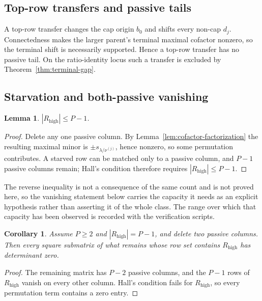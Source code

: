 \documentclass[11pt,a4paper]{amsart}
\numberwithin{equation}{section}
\theoremstyle{plain}
\newtheorem{lemma}[theorem]{Lemma}
\newtheorem{corollary}[theorem]{Corollary}
\theoremstyle{definition}
\begin{document}
\subsection{Top-row transfers and passive tails}

A top-row transfer changes the cap origin \(b_0\) and shifts every non-cap \(d_j\).  Connectedness makes the larger parent's terminal maximal cofactor nonzero, so the terminal shift is necessarily supported.  Hence a top-row transfer has no passive tail.  On the ratio-identity locus such a transfer is excluded by Theorem~\ref{thm:terminal-gap}.

\subsection{Starvation and both-passive vanishing}

\begin{lemma}\label{lem:starvation}
\(|R_{\mathrm{high}}|\le P-1\).
\end{lemma}

\begin{proof}
Delete any one passive column.  By Lemma~\ref{lem:cofactor-factorization} the resulting maximal minor is \(\pm s_{\lambda/\nu^{(j)}}\), hence nonzero, so some permutation contributes.  A starved row can be matched only to a passive column, and \(P-1\) passive columns remain; Hall's condition therefore requires \(|R_{\mathrm{high}}|\le P-1\).
\end{proof}

The reverse inequality is not a consequence of the same count and is not proved here, so the vanishing statement below carries the capacity it needs as an explicit hypothesis rather than asserting it of the whole class.  The range over which that capacity has been observed is recorded with the verification scripts.

\begin{corollary}\label{cor:both-passive}
Assume \(P\ge2\) and \(|R_{\mathrm{high}}|=P-1\), and delete two passive columns.  Then every square submatrix of what remains whose row set contains \(R_{\mathrm{high}}\) has determinant zero.
\end{corollary}

\begin{proof}
The remaining matrix has \(P-2\) passive columns, and the \(P-1\) rows of \(R_{\mathrm{high}}\) vanish on every other column.  Hall's condition fails for \(R_{\mathrm{high}}\), so every permutation term contains a zero entry.
\end{proof}
\end{document}
